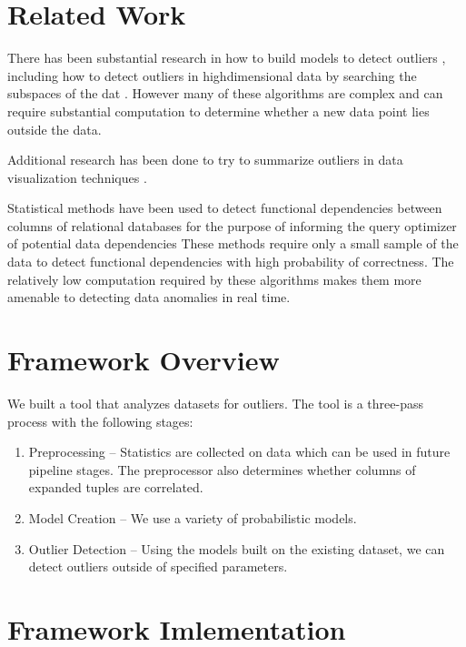 \documentclass{vldb}
\begin{document}
\section{Related Work}

There has been substantial research in how to build models to detect outliers \cite{Aggarwal2013}, including how to detect outliers in high­dimensional data by searching the subspaces of the dat \cite{Zhang2004}\cite{Kriegel2009}.
However many of these algorithms are complex and can require substantial computation to determine whether a new data point lies outside the data.

Additional research has been done to try to summarize outliers in data visualization techniques \cite{Wu}.

Statistical methods have been used to detect functional dependencies between columns of relational databases for the purpose of informing the query optimizer of potential data dependencies \cite{Ilyas2004} 
These methods require only a small sample of the data to detect functional dependencies with high probability of correctness.
The relatively low computation required by these algorithms makes them more amenable to detecting data anomalies in real time.


\section{Framework Overview}
We built a tool that analyzes datasets for outliers.
The tool is a three-pass process with the following stages:
\begin{enumerate}
\item Preprocessing -- Statistics are collected on data which can be used in future pipeline stages. The preprocessor also determines whether columns of expanded tuples are correlated.
\item Model Creation -- We use a variety of probabilistic models. 
\item Outlier Detection -- Using the models built on the existing dataset, we can detect outliers outside of specified parameters.
\end{enumerate}

\section{Framework Imlementation}
\end{document}
